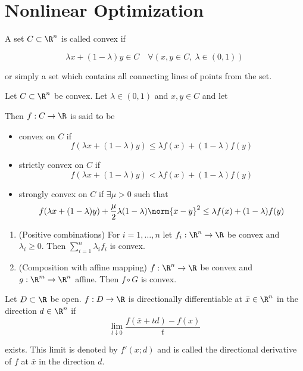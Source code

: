 
\section{Nonlinear Optimization}\label{d1c9db1}


A set $C\subset\R^n$ is called convex if

$$
	\lambda x+(1-\lambda)y\in C\quad
	\forall(x,y\in C,\ \lambda\in(0,1))
$$

or simply a set which contains all connecting lines of points from the
set.


Let $C\subset\R^n$ be convex. Let $\lambda\in(0,1)$ and $x,y\in C$ and
let

Then $f:C\to\R$ is said to be

\begin{itemize}
	\item convex on $C$ if
	      $$f(\lambda x+(1-\lambda)y)\leq\lambda f(x)+(1-\lambda)f(y)$$
	\item strictly convex on $C$ if
	      $$f(\lambda x+(1-\lambda)y)<\lambda f(x)+(1-\lambda)f(y)$$
	\item strongly convex on $C$ if $\exists\mu>0$ such that
	      $$f(\lambda x+(1-\lambda)y)+\frac{\mu}{2}\lambda(1-\lambda)\norm{x-y}^2\leq\lambda f(x)+(1-\lambda)f(y)$$
\end{itemize}


\begin{enumerate}
	\item (Positive combinations) For $i=1,\ldots,n$ let $f_i:\R^n\to\R$ be
	      convex and $\lambda_i\geq0$. Then $\sum_{i=1}^n\lambda_if_i$ is
	      convex.
	\item (Composition with affine mapping) $f:\R^n\to\R$ be convex
	      and $g:\R^m\to\R^n$ affine. Then $f\circ G$ is convex.
\end{enumerate}

\label{37eb747}

Let $D\subset \R$ be open. $f:D\to\R$ is directionally differentiable
at $\bar x\in\R^n$ in the direction $d\in\R^n$ if
$$
	\lim_{t\downarrow0}\frac{f(\bar x+td)-f(x)}t
$$

exists. This limit is denoted by $f'(x;d)$ and is called the
directional derivative of $f$ at $\bar x$ in the direction $d$.

